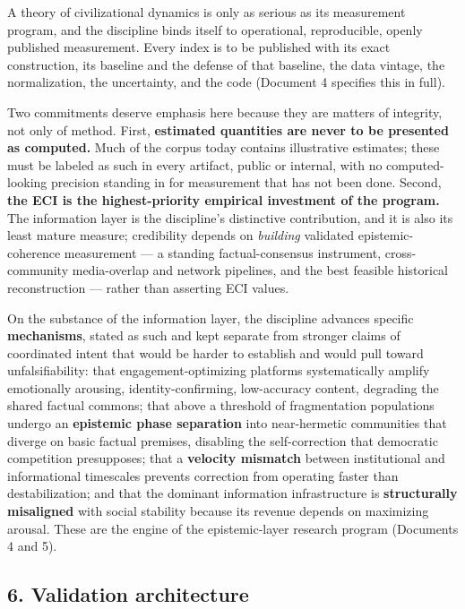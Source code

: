 \documentclass[
]{article}
\begin{document}
A theory of civilizational dynamics is only as serious as its
measurement program, and the discipline binds itself to operational,
reproducible, openly published measurement. Every index is to be
published with its exact construction, its baseline and the defense of
that baseline, the data vintage, the normalization, the uncertainty, and
the code (Document 4 specifies this in full).

Two commitments deserve emphasis here because they are matters of
integrity, not only of method. First, \textbf{estimated quantities are
never to be presented as computed.} Much of the corpus today contains
illustrative estimates; these must be labeled as such in every artifact,
public or internal, with no computed-looking precision standing in for
measurement that has not been done. Second, \textbf{the ECI is the
highest-priority empirical investment of the program.} The information
layer is the discipline's distinctive contribution, and it is also its
least mature measure; credibility depends on \emph{building} validated
epistemic-coherence measurement --- a standing factual-consensus
instrument, cross-community media-overlap and network pipelines, and the
best feasible historical reconstruction --- rather than asserting ECI
values.

On the substance of the information layer, the discipline advances
specific \textbf{mechanisms}, stated as such and kept separate from
stronger claims of coordinated intent that would be harder to establish
and would pull toward unfalsifiability: that engagement-optimizing
platforms systematically amplify emotionally arousing,
identity-confirming, low-accuracy content, degrading the shared factual
commons; that above a threshold of fragmentation populations undergo an
\textbf{epistemic phase separation} into near-hermetic communities that
diverge on basic factual premises, disabling the self-correction that
democratic competition presupposes; that a \textbf{velocity mismatch}
between institutional and informational timescales prevents correction
from operating faster than destabilization; and that the dominant
information infrastructure is \textbf{structurally misaligned} with
social stability because its revenue depends on maximizing arousal.
These are the engine of the epistemic-layer research program (Documents
4 and 5).

\subsection{6. Validation architecture}\label{validation-architecture}
\end{document}
